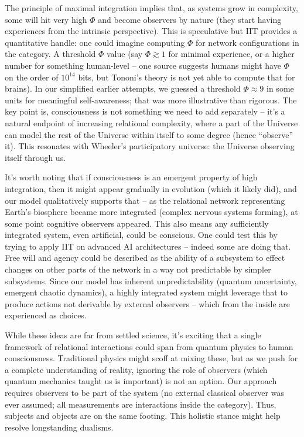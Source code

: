 \documentclass{article}
\begin{document}
\begin{description}
The principle of maximal integration implies that, as systems grow in complexity, some will hit very high $\Phi$ and become observers by nature (they start having experiences from the intrinsic perspective). This is speculative but IIT provides a quantitative handle: one could imagine computing $\Phi$ for network configurations in the category. A threshold $\Phi$ value (say $\Phi \gtrsim 1$ for minimal experience, or a higher number for something human-level – one source suggests humans might have $\Phi$ on the order of $10^{14}$ bits, but Tononi’s theory is not yet able to compute that for brains). In our simplified earlier attempts, we guessed a threshold $\Phi \approx 9$ in some units for meaningful self-awareness; that was more illustrative than rigorous. The key point is, consciousness is not something we need to add separately – it’s a natural endpoint of increasing relational complexity, where a part of the Universe can model the rest of the Universe within itself to some degree (hence “observe” it). This resonates with Wheeler’s participatory universe: the Universe observing itself through us\cite{wheeler1989}.

It’s worth noting that if consciousness is an emergent property of high integration, then it might appear gradually in evolution (which it likely did), and our model qualitatively supports that – as the relational network representing Earth’s biosphere became more integrated (complex nervous systems forming), at some point cognitive observers appeared. This also means any sufficiently integrated system, even artificial, could be conscious. One could test this by trying to apply IIT on advanced AI architectures – indeed some are doing that. Free will and agency could be described as the ability of a subsystem to effect changes on other parts of the network in a way not predictable by simpler subsystems. Since our model has inherent unpredictability (quantum uncertainty, emergent chaotic dynamics), a highly integrated system might leverage that to produce actions not derivable by external observers – which from the inside are experienced as choices.

While these ideas are far from settled science, it’s exciting that a single framework of relational interactions could span from quantum physics to human consciousness. Traditional physics might scoff at mixing these, but as we push for a complete understanding of reality, ignoring the role of observers (which quantum mechanics taught us is important) is not an option. Our approach requires observers to be part of the system (no external classical observer was ever assumed; all measurements are interactions inside the category). Thus, subjects and objects are on the same footing. This holistic stance might help resolve longstanding dualisms.
\end{description}
\end{document}
